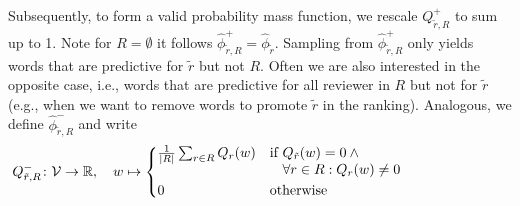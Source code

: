 \documentclass[letterpaper,twocolumn,10pt]{article}
\newcommand{\vocabulary}{\mathcal{V}}
\newcommand{\surroundingreviewers}{R}
\newcommand{\reviewer}{r}
\newcommand{\reviewerwordsmass}{Q}
\newcommand{\reviewerwords}{\hat{\topicworddist}}
\newcommand{\topicworddist}{\phi}
\newcommand{\word}{w}
\begin{document}
Subsequently, to form a valid probability mass function, we rescale $\reviewerwordsmass^+_{\tilde{\reviewer}, \surroundingreviewers}$ to sum up to 1. Note for $\surroundingreviewers = \emptyset$ it follows $\reviewerwords^+_{\tilde{\reviewer}, \surroundingreviewers} = \reviewerwords_{\tilde{\reviewer}}$. 
Sampling from $\reviewerwords^+_{\tilde{\reviewer}, \surroundingreviewers}$ only yields words that are predictive for $\tilde{\reviewer}$ but not $\surroundingreviewers$. 
Often we are also interested in the opposite case, i.e., words that are predictive for all reviewer in $\surroundingreviewers$ but not for $\tilde{\reviewer}$ (e.g., when we want to remove words to promote $\tilde{\reviewer}$ in the ranking). Analogous, we define  $\reviewerwords^-_{\tilde{\reviewer}, \surroundingreviewers}$ and write 
\[
    \reviewerwordsmass^-_{\tilde{\reviewer}, \surroundingreviewers} \colon \vocabulary \rightarrow \mathbb{R}, \quad \word \mapsto
    \begin{cases*}
        \frac{1}{|\surroundingreviewers|}\sum_{\reviewer \in \surroundingreviewers}{\reviewerwordsmass_{\reviewer}(w)} &
        if \parbox[t]{5.5cm}{$\reviewerwordsmass_{\tilde{\reviewer}}(w) = 0 \wedge\\   
         \forall r \in \surroundingreviewers: \reviewerwordsmass_{\reviewer}(w) \neq 0$} \\
        0 & otherwise \\
    \end{cases*}
\]
\end{document}

